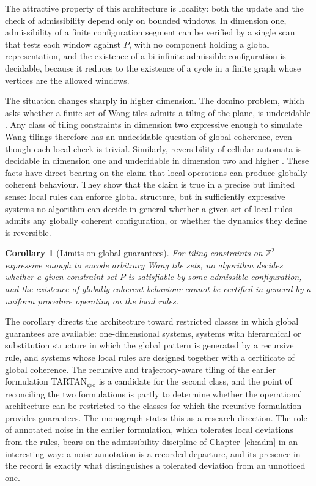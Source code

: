 \documentclass[11pt,twoside,openright]{book}
\theoremstyle{plain}
\newtheorem{corollary}[theorem]{Corollary}
\theoremstyle{definition}
\theoremstyle{remark}
\begin{document}
The attractive property of this architecture is locality: both the update and the check of admissibility depend only on bounded windows. In dimension one, admissibility of a finite configuration segment can be verified by a single scan that tests each window against $P$, with no component holding a global representation, and the existence of a bi-infinite admissible configuration is decidable, because it reduces to the existence of a cycle in a finite graph whose vertices are the allowed windows.

The situation changes sharply in higher dimension. The domino problem, which asks whether a finite set of Wang tiles admits a tiling of the plane, is undecidable \cite{berger1966,wang1961}. Any class of tiling constraints in dimension two expressive enough to simulate Wang tilings therefore has an undecidable question of global coherence, even though each local check is trivial. Similarly, reversibility of cellular automata is decidable in dimension one and undecidable in dimension two and higher \cite{kari1994}. These facts have direct bearing on the claim that local operations can produce globally coherent behaviour. They show that the claim is true in a precise but limited sense: local rules can enforce global structure, but in sufficiently expressive systems no algorithm can decide in general whether a given set of local rules admits any globally coherent configuration, or whether the dynamics they define is reversible.

\begin{corollary}[Limits on global guarantees]
For tiling constraints on $\mathbb{Z}^2$ expressive enough to encode arbitrary Wang tile sets, no algorithm decides whether a given constraint set $P$ is satisfiable by some admissible configuration, and the existence of globally coherent behaviour cannot be certified in general by a uniform procedure operating on the local rules.
\end{corollary}

The corollary directs the architecture toward restricted classes in which global guarantees are available: one-dimensional systems, systems with hierarchical or substitution structure in which the global pattern is generated by a recursive rule, and systems whose local rules are designed together with a certificate of global coherence. The recursive and trajectory-aware tiling of the earlier formulation TARTAN$_{\mathrm{geo}}$ is a candidate for the second class, and the point of reconciling the two formulations is partly to determine whether the operational architecture can be restricted to the classes for which the recursive formulation provides guarantees. The monograph states this as a research direction. The role of annotated noise in the earlier formulation, which tolerates local deviations from the rules, bears on the admissibility discipline of Chapter~\ref{ch:adm} in an interesting way: a noise annotation is a recorded departure, and its presence in the record is exactly what distinguishes a tolerated deviation from an unnoticed one.
\end{document}
